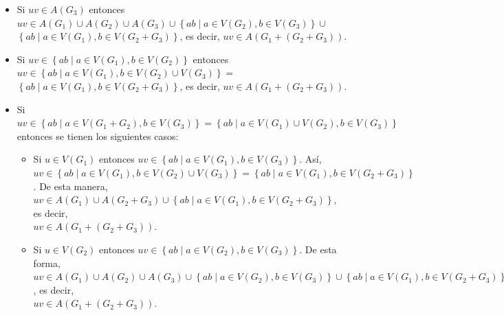 \documentclass[fleqn]{article}
\begin{document}
\begin{enumerate}[a)]
\begin{itemize}
            \item Si $ uv \in A \left( G_3 \right) $ entonces $ uv \in A \left( G_1 \right) \cup A \left( G_2 \right) \cup A \left( G_3 \right) \cup \left\lbrace ab \mid a \in V \left( G_2 \right), b \in V \left( G_3 \right) \right\rbrace \cup $ \\ $ \left\lbrace ab \mid a \in V \left( G_1 \right), b \in V \left( G_2 + G_3 \right) \right\rbrace $, es decir, $ uv \in A \left( G_1 + \left( G_2 + G_3 \right) \right) $.
            
            \item Si $ uv \in \left\lbrace ab \mid a \in V \left( G_1 \right), b \in V \left( G_2 \right) \right\rbrace $ entonces $ uv \in \left\lbrace ab \mid a \in V \left( G_1 \right), b \in V \left( G_2 \right) \cup V \left( G_3 \right) \right\rbrace = $ \\ $ \left\lbrace ab \mid a \in V \left( G_1 \right), b \in V \left( G_2 + G_3 \right) \right\rbrace $, es decir, $ uv \in A \left( G_1 + \left( G_2 + G_3 \right) \right) $.
            
            \item Si $ uv \in \left\lbrace ab \mid a \in V \left( G_1 + G_2 \right), b \in V \left( G_3 \right) \right\rbrace = \left\lbrace ab \mid a \in V \left( G_1 \right) \cup V \left( G_2 \right), b \in V \left( G_3 \right) \right\rbrace $ entonces se tienen los siguientes casos:
            
            \begin{itemize}
                \item Si $ u \in V \left( G_1 \right) $ entonces $ uv \in \left\lbrace ab \mid a \in V \left( G_1 \right), b \in V \left( G_3 \right) \right\rbrace $. Así, \\ $ uv \in \left\lbrace ab \mid a \in V \left( G_1 \right), b \in V \left( G_2 \right) \cup V \left( G_3 \right) \right\rbrace = \left\lbrace ab \mid a \in V \left( G_1 \right), b \in V \left( G_2 + G_3 \right)\right\rbrace $. De esta manera, $ uv \in A \left( G_1 \right) \cup A \left( G_2 + G_3 \right) \cup \left\lbrace ab \mid a \in V \left( G_1 \right), b \in V \left( G_2 + G_3 \right)\right\rbrace $, es decir, \\ $ uv \in A \left( G_1 + \left( G_2 + G_3 \right) \right) $.
                
                \item Si $ u \in V \left( G_2 \right) $ entonces $ uv \in \left\lbrace ab \mid a \in V \left( G_2 \right), b \in V \left( G_3 \right) \right\rbrace $. De esta forma, $ uv \in A \left( G_1 \right) \cup A \left( G_2 \right) \cup A \left( G_3 \right) \cup \left\lbrace ab \mid a \in V \left( G_2 \right), b \in V \left( G_3 \right) \right\rbrace \cup \left\lbrace ab \mid a \in V \left( G_1 \right), b \in V \left( G_2 + G_3 \right) \right\rbrace $, es decir, \\ $ uv \in A \left( G_1 + \left( G_2 + G_3 \right) \right) $.
            \end{itemize}
        \end{itemize}


\end{enumerate}
\end{document}
